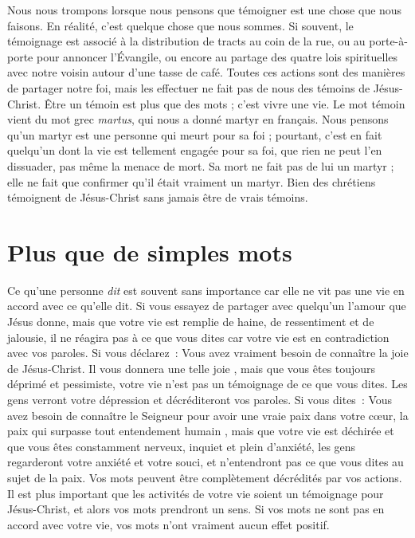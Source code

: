 Nous nous trompons lorsque nous pensons que témoigner
 est une chose que nous faisons.
 En réalité, c'est quelque chose que nous som\-mes.
 Si souvent, le témoignage est associé à la distribution de tracts
 au coin de la rue, ou au porte-à-porte pour annoncer l'Évangile,
 ou encore au partage des quatre lois spirituelles avec notre voisin
 autour d'une tasse de café.
 Toutes ces actions sont des manières de partager notre foi,
 mais les effectuer ne fait pas de nous des témoins de Jésus-Christ.
 Être un témoin est plus que des mots ; c'est vivre une vie.
 Le mot \og témoin \fg{} vient du mot grec \emph{martus},
 qui nous a donné martyr en français.
 Nous pensons qu'un martyr est une personne qui meurt pour sa foi ;
 pourtant, c'est en fait quelqu'un dont la vie est tellement engagée
 pour sa foi, que rien ne peut l'en dissuader, pas même la menace de mort.
 Sa mort ne fait pas de lui un martyr ; elle ne fait que confirmer
 qu'il était vraiment un martyr.
 Bien des chrétiens témoignent de Jésus-Christ
 sans jamais être de vrais témoins.

\section*{Plus que de simples mots}

Ce qu'une personne \emph{dit} est souvent sans importance
 car elle ne vit pas une vie en accord avec ce qu'elle dit.
 Si vous essayez de partager avec quelqu'un l'amour que Jésus donne,
 mais que votre vie est remplie de haine, de ressentiment et de jalousie,
 il ne réagira pas à ce que vous dites car votre vie est en contradiction
 avec vos paroles. Si vous déclarez~:
 \og Vous avez vraiment besoin de connaître la joie de Jésus-Christ.
 Il vous donnera une telle joie \fg{}, mais que vous êtes toujours déprimé
 et pessimiste, votre vie n'est pas un témoignage de ce que vous dites.
 Les gens verront votre dépression et décréditeront vos paroles.
 Si vous dites~: \og Vous avez besoin de connaître le Seigneur pour avoir
 une vraie paix dans votre cœur, la paix qui surpasse
 tout entendement humain \fg{}, mais que votre vie est déchirée
 et que vous êtes constamment nerveux, inquiet et plein d'anxiété,
 les gens regarderont votre anxiété et votre souci,
 et n'entendront pas ce que vous dites au sujet de la paix.
 Vos mots peuvent être complètement décrédités par vos actions.
 Il est plus important que les activités de votre vie soient
 un témoignage pour Jésus-Christ, et alors vos mots prendront un sens.
 Si vos mots ne sont pas en accord avec votre vie,
 vos mots n'ont vraiment aucun effet positif.

